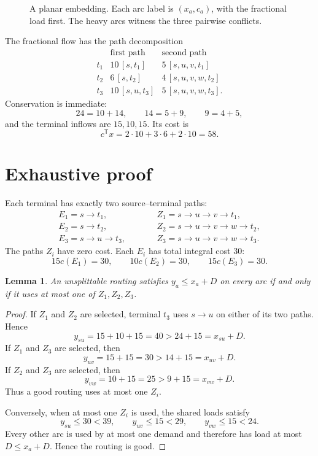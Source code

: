 \documentclass[11pt]{article}
\newtheorem{lemma}[theorem]{Lemma}
\theoremstyle{definition}
\newcommand{\1}{\mathbf{1}}
\begin{document}
\begin{figure}[ht]
\centering

\caption{A planar embedding.  Each arc label is $(x_a,c_a)$, with the
fractional load first.  The heavy arcs witness the three pairwise conflicts.}
\label{fig:network}
\end{figure}

The fractional flow has the path decomposition
\[
\begin{array}{c|cc}
 & \text{first path} & \text{second path}\\
\hline
 t_1 & 10\,[s,t_1] & 5\,[s,u,v,t_1]\\
 t_2 & 6\,[s,t_2] & 4\,[s,u,v,w,t_2]\\
 t_3 & 10\,[s,u,t_3] & 5\,[s,u,v,w,t_3].
\end{array}
\]
Conservation is immediate:
\[
24=10+14,\qquad 14=5+9,\qquad 9=4+5,
\]
and the terminal inflows are $15,10,15$.
Its cost is
\[
 c^\mathsf{T}x=2\cdot10+3\cdot6+2\cdot10=58.
\]

\section{Exhaustive proof}

Each terminal has exactly two source--terminal paths:
\[
\begin{array}{lll}
E_1=s\to t_1,
&\qquad&
Z_1=s\to u\to v\to t_1,\\[1mm]
E_2=s\to t_2,
&&
Z_2=s\to u\to v\to w\to t_2,\\[1mm]
E_3=s\to u\to t_3,
&&
Z_3=s\to u\to v\to w\to t_3.
\end{array}
\]
The paths $Z_i$ have zero cost.  Each $E_i$ has total integral cost $30$:
\[
15c(E_1)=30,\qquad 10c(E_2)=30,\qquad 15c(E_3)=30.
\]

\begin{lemma}\label{lem:conflict}
An unsplittable routing satisfies $y_a\le x_a+D$ on every arc if and only if
it uses at most one of $Z_1,Z_2,Z_3$.
\end{lemma}

\begin{proof}
If $Z_1$ and $Z_2$ are selected, terminal $t_3$ uses $s\to u$ on either of
its two paths.  Hence
\[
 y_{su}=15+10+15=40>24+15=x_{su}+D.
\]
If $Z_1$ and $Z_3$ are selected, then
\[
 y_{uv}=15+15=30>14+15=x_{uv}+D.
\]
If $Z_2$ and $Z_3$ are selected, then
\[
 y_{vw}=10+15=25>9+15=x_{vw}+D.
\]
Thus a good routing uses at most one $Z_i$.

Conversely, when at most one $Z_i$ is used, the shared loads satisfy
\[
 y_{su}\le30<39,\qquad y_{uv}\le15<29,\qquad y_{vw}\le15<24.
\]
Every other arc is used by at most one demand and therefore has load at most
$D\le x_a+D$.  Hence the routing is good.
\end{proof}
\end{document}
